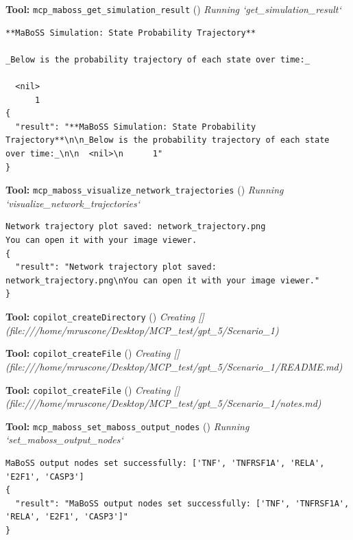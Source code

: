 \documentclass[11pt,a4paper]{article}
\begin{document}
\begin{toolokbox}
\textbf{Tool:} \texttt{mcp\_maboss\_get\_simulation\_result} (\checkmark)
\textit{Running `get\_simulation\_result`}
\begin{lstlisting}
**MaBoSS Simulation: State Probability Trajectory**

_Below is the probability trajectory of each state over time:_

  <nil>
      1
{
  "result": "**MaBoSS Simulation: State Probability Trajectory**\n\n_Below is the probability trajectory of each state over time:_\n\n  <nil>\n      1"
}
\end{lstlisting}
\end{toolokbox}
\begin{toolokbox}
\textbf{Tool:} \texttt{mcp\_maboss\_visualize\_network\_trajectories} (\checkmark)
\textit{Running `visualize\_network\_trajectories`}
\begin{lstlisting}
Network trajectory plot saved: network_trajectory.png
You can open it with your image viewer.
{
  "result": "Network trajectory plot saved: network_trajectory.png\nYou can open it with your image viewer."
}
\end{lstlisting}
\end{toolokbox}
\begin{toolokbox}
\textbf{Tool:} \texttt{copilot\_createDirectory} (\checkmark)
\textit{Creating [](file:///home/mruscone/Desktop/MCP\_test/gpt\_5/Scenario\_1)}
\end{toolokbox}
\begin{toolokbox}
\textbf{Tool:} \texttt{copilot\_createFile} (\checkmark)
\textit{Creating [](file:///home/mruscone/Desktop/MCP\_test/gpt\_5/Scenario\_1/README.md)}
\end{toolokbox}
\begin{toolokbox}
\textbf{Tool:} \texttt{copilot\_createFile} (\checkmark)
\textit{Creating [](file:///home/mruscone/Desktop/MCP\_test/gpt\_5/Scenario\_1/notes.md)}
\end{toolokbox}
\begin{toolokbox}
\textbf{Tool:} \texttt{mcp\_maboss\_set\_maboss\_output\_nodes} (\checkmark)
\textit{Running `set\_maboss\_output\_nodes`}
\begin{lstlisting}
MaBoSS output nodes set successfully: ['TNF', 'TNFRSF1A', 'RELA', 'E2F1', 'CASP3']
{
  "result": "MaBoSS output nodes set successfully: ['TNF', 'TNFRSF1A', 'RELA', 'E2F1', 'CASP3']"
}
\end{lstlisting}
\end{toolokbox}
\end{document}
